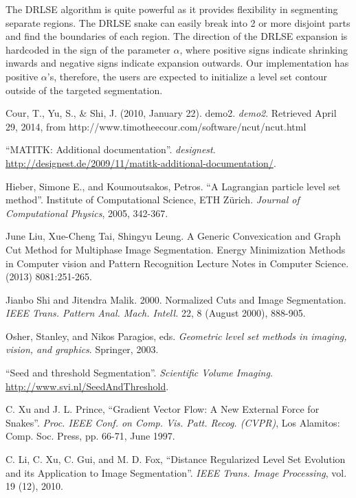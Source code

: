 \documentclass{article}
\begin{document}
The DRLSE algorithm is quite powerful as it provides flexibility in segmenting separate regions. The DRLSE snake can easily break into 2 or more disjoint parts and find the boundaries of each region. The direction of the DRLSE expansion is hardcoded in the sign of the parameter $\alpha$, where positive signs indicate shrinking inwards and negative signs indicate expansion outwards. Our implementation has positive $\alpha$'s, therefore, the users are expected to initialize a level set contour outside of the targeted segmentation.



\clearpage
\begin{thebibliography}{9}
\fontsize{10pt}{12pt}\selectfont
\raggedright

        Cour, T., Yu, S., \& Shi, J. (2010, January 22). demo2. \emph{demo2}. Retrieved April 29, 2014, from http://www.timotheecour.com/software/ncut/ncut.html

        ``MATITK: Additional documentation''.
        \emph{designest}.
        \url{http://designest.de/2009/11/matitk-additional-documentation/}.

        Hieber, Simone E., and Koumoutsakos, Petros.
        ``A Lagrangian particle level set method''.
        Institute of Computational Science, ETH Zürich.
        \emph{Journal of Computational Physics}, 2005, 342-367.

        June Liu, Xue-Cheng Tai, Shingyu Leung. A Generic Convexication and Graph Cut Method for Multiphase Image Segmentation. Energy Minimization Methods in Computer vision and Pattern Recognition Lecture Notes in Computer Science. (2013) 8081:251-265.

        Jianbo Shi and Jitendra Malik. 2000. Normalized Cuts and Image Segmentation. \emph{IEEE Trans. Pattern Anal. Mach. Intell.} 22, 8 (August 2000), 888-905.

        Osher, Stanley, and Nikos Paragios, eds. 
        \emph{Geometric level set methods in imaging, vision, and graphics}.
        Springer, 2003.

        ``Seed and threshold Segmentation''.
        \emph{Scientific Volume Imaging}.
        \url{http://www.svi.nl/SeedAndThreshold}.

        C. Xu and J. L. Prince, ``Gradient Vector Flow: A New External Force for Snakes''.
        \emph{Proc. IEEE Conf. on Comp. Vis. Patt. Recog. (CVPR)}, 
        Los Alamitos: Comp. Soc. Press, pp. 66-71, June 1997.

        C. Li, C. Xu, C. Gui, and M. D. Fox, 
        ``Distance Regularized Level Set Evolution and its Application to Image Segmentation''.
        \emph{IEEE Trans. Image Processing}, 
        vol. 19 (12), 2010.
        
        
\end{thebibliography}


\end{document}
